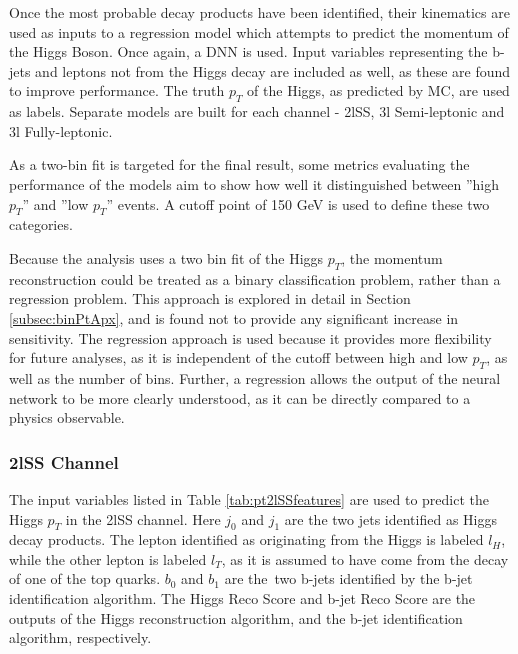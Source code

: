 Once the most probable decay products have been identified, their kinematics are used as inputs to a regression model which attempts to predict the momentum of the Higgs Boson. Once again, a DNN is used. Input variables representing the b-jets and leptons not from the Higgs decay are included as well, as these are found to improve performance. The truth $p_T$ of the Higgs, as predicted by MC, are used as labels. Separate models are built for each channel - 2lSS, 3l Semi-leptonic and 3l Fully-leptonic.

As a two-bin fit is targeted for the final result, some metrics evaluating the performance of the models aim to show how well it distinguished between ''high $p_T$'' and ''low $p_T$'' events. A cutoff point of 150 GeV is used to define these two categories.

Because the analysis uses a two bin fit of the Higgs $p_T$, the momentum reconstruction could be treated as a binary classification problem, rather than a regression problem. This approach is explored in detail in Section \ref{subsec:binPtApx}, and is found not to provide any significant increase in sensitivity. The regression approach is used because it provides more flexibility for future analyses, as it is independent of the cutoff between high and low $p_T$, as well as the number of bins. Further, a regression allows the output of the neural network to be more clearly understood, as it can be directly compared to a physics observable.

\subsubsection{2lSS Channel}
\label{subsec:pt2lSS}                                                                                                      

The input variables listed in Table \ref{tab:pt2lSSfeatures} are used to predict the Higgs $p_T$ in the 2lSS channel. Here $j_0$ and $j_1$ are the two jets identified as Higgs decay products. The lepton identified as originating from the Higgs is labeled $l_H$, while the other lepton is labeled $l_T$, as it is assumed to have come from the decay of one of the top quarks. $b_0$ and $b_1$ are the\ two b-jets identified by the b-jet identification algorithm. The Higgs Reco Score and b-jet Reco Score are the outputs of the Higgs reconstruction algorithm, and the b-jet identification algorithm, respectively.

